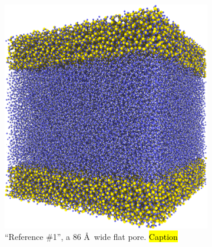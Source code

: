 %
\begin{figure}[htpb]%
    \centering%
    \setlength{\myfigwidth}{0.49\textwidth}%
%
    \begin{subfigure}[t]{\myfigwidth}%
        \centering%
        \includegraphics[width=\textwidth]{images/systems/trimmed-flat_square_fracture02_03}%
        \caption{%
            ``Reference \#1'', a 86 \AA\ wide flat pore.  \hl{Caption} %
        }%
        \label{fig:renderings_flat_square_fracture02}%
    \end{subfigure}%
    \hfill%
    \begin{subfigure}[t]{\myfigwidth}%
        \centering%

\end{subfigure}
\end{figure}
